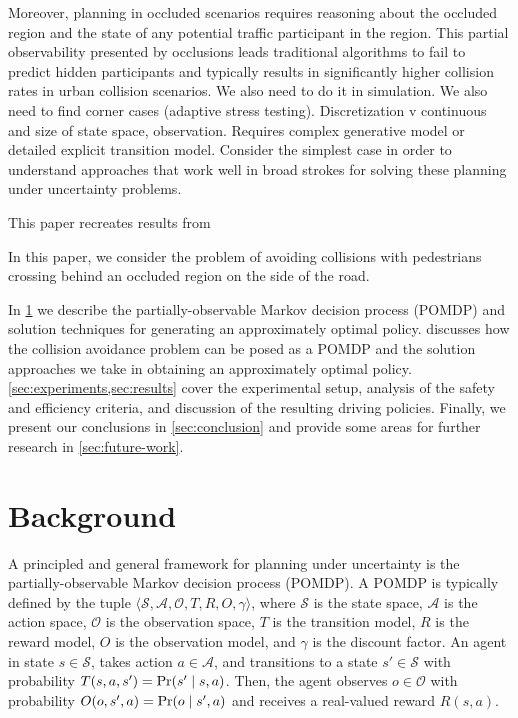 \documentclass[conference]{IEEEtran}
\begin{document}
Moreover, planning in occluded scenarios requires reasoning about the occluded region and the state of any potential traffic participant in the region. This partial observability presented by occlusions leads traditional algorithms to fail to predict hidden participants and typically results in significantly higher collision rates in urban collision scenarios. We also need to do it in simulation. We also need to find corner cases (adaptive stress testing). Discretization v continuous and size of state space, observation. Requires complex generative model or detailed explicit transition model. Consider the simplest case in order to understand approaches that work well in broad strokes for solving these planning under uncertainty problems.

This paper recreates results from 

In this paper, we consider the problem of avoiding collisions with pedestrians crossing behind an occluded region on the side of the road. 

In \cref{sec:background} we describe the partially-observable Markov decision process (POMDP) and solution techniques for generating an approximately optimal policy.  discusses how the collision avoidance problem can be posed as a POMDP and the solution approaches we take in obtaining an approximately optimal policy. \cref{sec:experiments,sec:results} cover the experimental setup, analysis of the safety and efficiency criteria, and discussion of the resulting driving policies. Finally, we present our conclusions in \cref{sec:conclusion} and provide some areas for further research in \cref{sec:future-work}.

\section{Background}
\label{sec:background}

A principled and general framework for planning under uncertainty is the partially-observable Markov decision process (POMDP). A POMDP is typically defined by the tuple $\langle \mathcal{S},\mathcal{A}, \mathcal{O}, T, R, O, \gamma \rangle$, where $\mathcal{S}$ is the state space, $\mathcal{A}$ is the action space, $\mathcal{O}$ is the observation space, $T$ is the transition model, $R$ is the reward model, $O$ is the observation model, and $\gamma$ is the discount factor. An agent in state $s \in \mathcal{S}$, takes action $a \in \mathcal{A}$, and transitions to a state $s' \in \mathcal{S}$ with probability $T(s, a, s') = \textnormal{Pr}(s' \mid s, a)$. Then, the agent observes $o \in \mathcal{O}$ with probability $O(o, s',a) = \textnormal{Pr}(o\mid s', a)$ and receives a real-valued reward $R(s, a)$. 
\end{document}
